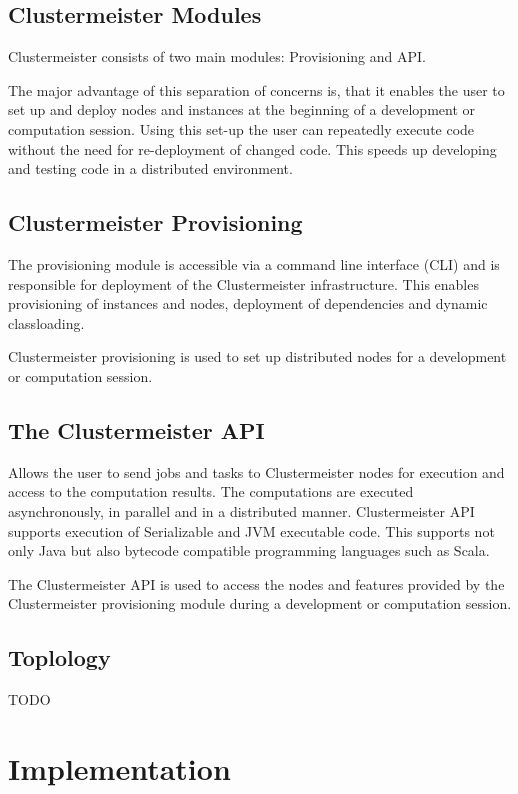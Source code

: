 \documentclass{article}
\begin{document}
\subsection{Clustermeister Modules}

Clustermeister consists of two main modules: Provisioning and API.

The major advantage of this separation of concerns is, that it enables the user to set up and deploy nodes and instances at the beginning of a development or computation session. Using this set-up the user can repeatedly execute code without the need for re-deployment of changed code. This speeds up developing and testing code in a distributed environment.

\subsection{Clustermeister Provisioning}
The provisioning module is accessible via a command line interface (CLI) and is responsible for deployment of the Clustermeister infrastructure. This enables provisioning of instances and nodes, deployment of dependencies and dynamic classloading.

Clustermeister provisioning is used to set up distributed nodes for a development or computation session.

\subsection{The Clustermeister API}
Allows the user to send jobs and tasks to Clustermeister nodes for execution and access to the computation results. The computations are executed asynchronously, in parallel and in a distributed manner. Clustermeister API supports execution of Serializable and JVM executable code. This supports not only Java but also bytecode compatible programming languages such as Scala.

The Clustermeister API is used to access the nodes and features provided by the Clustermeister provisioning module during a development or computation session.

\subsection{Toplology}

TODO

\section{Implementation}
\end{document}
